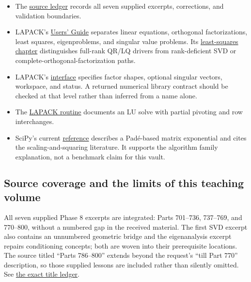 \begin{itemize}
\tightlist
\item
  The \hyperref[appendix-a103e7846d21-phase-8---source-analysis-and-verification]{source ledger} records all seven supplied excerpts, corrections, and validation boundaries.
\item
  LAPACK's \href{https://netlib.org/lapack/lug/index.html}{Users' Guide} separates linear equations, orthogonal factorizations, least squares, eigenproblems, and singular value problems. Its \href{https://www.netlib.org/lapack/lug/node27.html}{least-squares chapter} distinguishes full-rank QR/LQ drivers from rank-deficient SVD or complete-orthogonal-factorization paths.
\item
  LAPACK's \href{https://netlib.org/lapack/explore-html/d1/d7f/group__gesvd_gac6bd5d4e645049e49bb70691180abf07.html}{ interface} specifies factor shapes, optional singular vectors, workspace, and status. A returned numerical library contract should be checked at that level rather than inferred from a name alone.
\item
  The \href{https://netlib.org/lapack/explore-html/d8/da6/group__gesv_ga831ce6a40e7fd16295752d18aed2d541.html}{LAPACK  routine} documents an LU solve with partial pivoting and row interchanges.
\item
  SciPy's current \href{https://docs.scipy.org/doc/scipy/reference/generated/scipy.sparse.linalg.expm.html}{ reference} describes a Padé-based matrix exponential and cites the scaling-and-squaring literature. It supports the algorithm family explanation, not a benchmark claim for this vault.
\end{itemize}

\subsection{Source coverage and the limits of this teaching volume}\label{02-foundations-ii-ch039-source-coverage-and-the-limits-of-this-teaching-volume}

\hypertarget{02-foundations-ii-ch039-source-coverage-and-the-limits-of-this-teaching-volume}{}

All seven supplied Phase 8 excerpts are integrated: Parts 701--736, 737--769, and 770--800, without a numbered gap in the received material. The first SVD excerpt also contains an unnumbered geometric bridge and the eigenanalysis excerpt repairs conditioning concepts; both are woven into their prerequisite locations. The source titled ``Parts 786--800'' extends beyond the request's ``till Part 770'' description, so those supplied lessons are included rather than silently omitted. See \hyperref[appendix-fd090d982a15-phase-8---parts-701-800]{the exact title ledger}.

